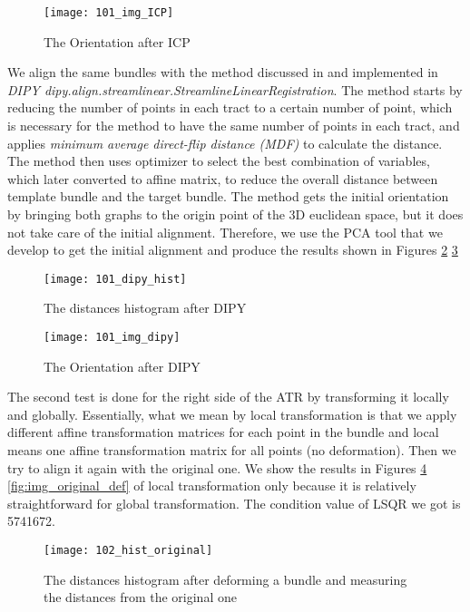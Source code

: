 \documentclass[../structure.tex]{subfiles}
\begin{document}
\begin{figure}[h!]
\centering
\texttt{[image: 101\_img\_ICP]}
\captionsetup{justification=centering}
\caption{The Orientation after ICP}
\label{fig:img_ICP}
\end{figure}
\pagebreak
We align the same bundles with the method discussed in \cite{Garyfallidis2012} and implemented in \textit{DIPY dipy.align.streamlinear.StreamlineLinearRegistration}. The method starts by reducing the number of points in each tract to a certain number of point, which is necessary for the method to have the same number of points in each tract, and applies \textit{minimum average direct-flip distance (MDF)} to calculate the distance. The method then uses optimizer to select the best combination of variables, which later converted to affine matrix, to reduce the overall distance between template bundle and the target bundle. The method gets the initial orientation by bringing both graphs to the origin point of the 3D euclidean space, but it does not take care of the initial alignment. Therefore, we use the PCA tool that we develop to get the initial alignment and produce the results shown in Figures \ref{fig:dipy_hist} \ref{fig:img_dipy}

\begin{figure}[h!]
\centering
\texttt{[image: 101\_dipy\_hist]}
\captionsetup{justification=centering}
\caption{The distances histogram after DIPY}
\label{fig:dipy_hist}
\end{figure}

\begin{figure}[h!]
\centering
\texttt{[image: 101\_img\_dipy]}
\captionsetup{justification=centering}
\caption{The Orientation after DIPY}
\label{fig:img_dipy}
\end{figure}
\pagebreak

The second test is done for the right side of the ATR by transforming it locally and globally. Essentially, what we mean by local transformation is that we apply different affine transformation matrices for each point in the bundle and local means one affine transformation matrix for all points (no deformation). Then we try to align it again with the original one. We show the results in Figures \ref{fig:hist_original_def} \ref{fig:img_original_def} of local transformation only because it is relatively straightforward for global transformation. The condition value of LSQR we got is 5741672.

\begin{figure}[h!]
\centering
\texttt{[image: 102\_hist\_original]}
\captionsetup{justification=centering}
\caption{The distances histogram after deforming a bundle and measuring the distances from the original one}
\label{fig:hist_original_def}
\end{figure}
\end{document}
